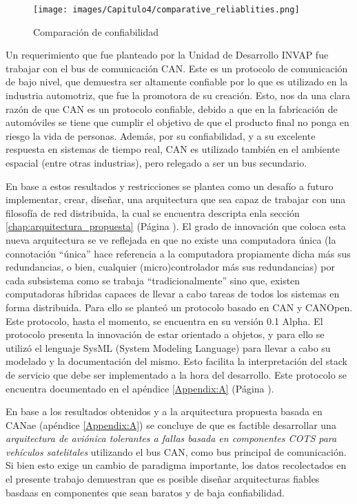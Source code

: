 \begin{figure}[H]
 \centering
 \texttt{[image: images/Capitulo4/comparative\_reliablities.png]}
  \caption{Comparación de confiabilidad}
\label{fig:comparative_reliablitiesConclusion}
\end{figure}

Un requerimiento que fue planteado por la Unidad de Desarrollo INVAP fue trabajar
con el bus de comunicación CAN. Este es un protocolo de comunicación de bajo nivel,
que demuestra ser altamente confiable por lo que es utilizado en la industria automotriz,
que fue la promotora de su creación. Esto, nos da una clara razón de que CAN es un
protocolo confiable, debido a que en la fabricación de automóviles se tiene que cumplir
el objetivo de que el producto final no ponga en riesgo la vida de personas.
Además, por su confiabilidad, y a su excelente respuesta en sistemas de tiempo real,
CAN es utilizado también en el ambiente espacial (entre otras industrias), pero
relegado a ser un bus secundario.

En base a estos resultados y restricciones se plantea como un desafío a futuro implementar,
crear, diseñar, una arquitectura que sea capaz de trabajar con una filosofía
de red distribuida, la cual se encuentra descripta enla sección \ref{chap:arquitectura_propuesta}
(Página \pageref{chap:arquitectura_propuesta}). El grado de innovación que coloca
esta nueva arquitectura se ve reflejada en que no existe una computadora única (la
connotación ``única'' hace referencia a la computadora propiamente dicha más sus
redundancias, o bien, cualquier (micro)controlador más sus redundancias) por cada
subsistema como se trabaja ``tradicionalmente'' sino que, existen computadoras
híbridas capaces de llevar a cabo tareas de todos los sistemas en forma distribuida. 
Para ello se planteó un protocolo basado en CAN y CANOpen. Este protocolo, hasta el
momento, se encuentra en su versión 0.1 Alpha. El protocolo
presenta la innovación de estar orientado a objetos, y para ello se utilizó el
lenguaje SysML (System Modeling Language) para llevar a cabo su modelado y
la documentación del mismo. Esto facilita la interpretación del
stack de servicio que debe ser implementado a la hora del desarrollo. Este protocolo
se encuentra documentado en el apéndice \ref{Appendix:A} (Página \pageref{Appendix:A}).

En base a los resultados obtenidos y a la arquitectura propuesta basada en CANae
(apéndice \ref{Appendix:A}) se concluye de que es factible  desarrollar una
\textit{arquitectura de aviónica tolerantes a fallas basada en componentes COTS para
  vehículos satelitales} utilizando el bus CAN, como bus principal de comunicación.
Si bien esto exige un cambio de paradigma importante, los datos recolectados en el
presente trabajo demuestran que es posible diseñar arquitecturas
fiables basdaas en componentes que sean baratos y de baja confiabilidad. 

